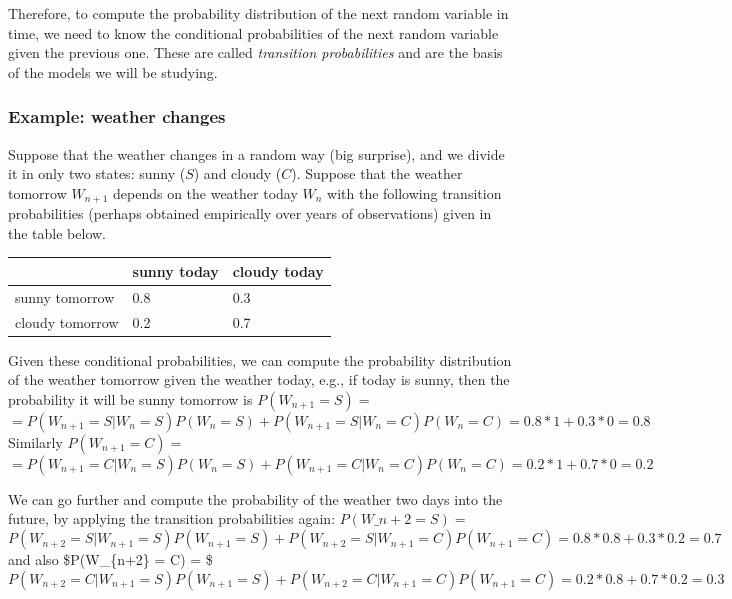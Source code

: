 \documentclass[
  letterpaper,
  DIV=11,
  numbers=noendperiod]{scrreprt}
\begin{document}
Therefore, to compute the probability distribution of the next random
variable in time, we need to know the conditional probabilities of the
next random variable given the previous one. These are called
\emph{transition probabilities} and are the basis of the models we will
be studying.

\subsubsection{Example: weather changes}\label{example-weather-changes}

Suppose that the weather changes in a random way (big surprise), and we
divide it in only two states: sunny (\(S\)) and cloudy (\(C\)). Suppose
that the weather tomorrow \(W_{n+1}\) depends on the weather today
\(W_n\) with the following transition probabilities (perhaps obtained
empirically over years of observations) given in the table below.

\begin{longtable}[]{@{}lll@{}}
\toprule\noalign{}
& sunny today & cloudy today \\
\midrule\noalign{}
\endhead
\bottomrule\noalign{}
\endlastfoot
sunny tomorrow & 0.8 & 0.3 \\
cloudy tomorrow & 0.2 & 0.7 \\
\end{longtable}

Given these conditional probabilities, we can compute the probability
distribution of the weather tomorrow given the weather today, e.g., if
today is sunny, then the probability it will be sunny tomorrow is
\(P(W_{n+1} = S ) =\)
\[ = P(W_{n+1} = S | W_n = S) P(W_n = S) + P(W_{n+1} = S | W_n = C) P(W_n = C) = 0.8 * 1  + 0.3* 0 = 0.8\]
Similarly \(P(W_{n+1} = C)=\)
\[ = P(W_{n+1} = C | W_n = S) P(W_n = S) + P(W_{n+1} = C | W_n = C) P(W_n = C) = 0.2 * 1  + 0.7* 0 = 0.2\]

We can go further and compute the probability of the weather two days
into the future, by applying the transition probabilities again:
\(P(W\_{n+2} = S ) =\)
\[P(W_{n+2} = S | W_{n+1} = S) P(W_{n+1} = S) + P(W_{n+2} = S | W_{n+1} = C) P(W_{n+1} = C) = 0.8 * 0.8  + 0.3* 0.2 = 0.7\]
and also \$P(W\_\{n+2\} = C) = \$
\[P(W_{n+2} = C | W_{n+1} = S) P(W_{n+1} = S) + P(W_{n+2} = C | W_{n+1} = C) P(W_{n+1} = C) = 0.2 *0.8  + 0.7* 0.2 = 0.3\]
\end{document}
